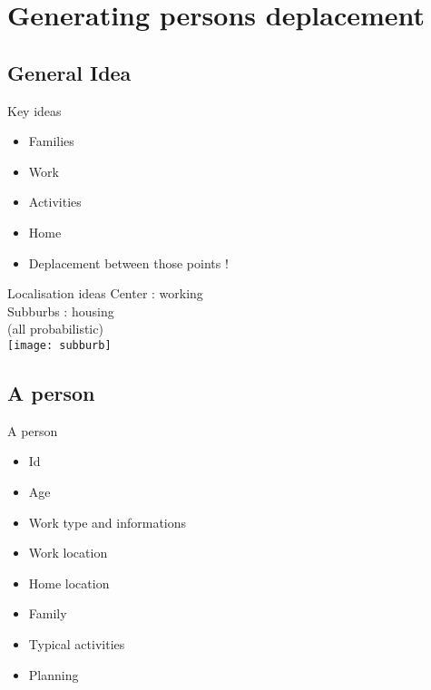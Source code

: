 \section{Generating persons deplacement}
\subsection{General Idea}

\begin{frame}{}

\begin{block}{Key ideas}
\begin{itemize}
\item Families
\item Work
\item Activities
\item Home
\item Deplacement between those points !
\end{itemize}
\end{block}
\end{frame}


\begin{frame}{Localisation ideas}
Center : working \\
Subburbs : housing \\
(all probabilistic)\\
\texttt{[image: subburb]}


\end{frame}
\subsection{A person}

\begin{frame}{A person}
\begin{itemize}
\item Id
\item Age
\item Work type and informations
\item Work location
\item Home location
\item Family
\item Typical activities
\item Planning
\end{itemize}
\end{frame}


